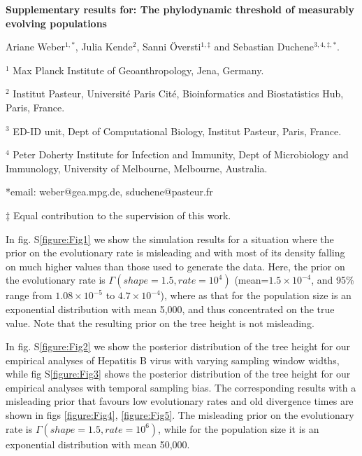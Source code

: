 \documentclass[11pt]{article}
\begin{document}
\begin{flushright}

\end{flushright}
\begin{center}
	\begin{LARGE}
	\textbf{Supplementary results for: The phylodynamic threshold of measurably evolving populations}
	\end{LARGE}


Ariane Weber$^{1,*}$, Julia Kende$^{2}$, Sanni Översti$^{1, \ddagger}$ and Sebastian Duchene$^{3,4,\ddagger, *}$.
\end{center}

$^{1}$ Max Planck Institute of Geoanthropology, Jena, Germany.

$^{2}$ Institut Pasteur, Université Paris Cité, Bioinformatics and Biostatistics Hub, Paris, France.

$^{3}$ ED-ID unit, Dept of Computational Biology, Institut Pasteur, Paris, France.

$^{4}$ Peter Doherty Institute for Infection and Immunity, Dept of Microbiology and Immunology, University of Melbourne, Melbourne, Australia.
\newline

*email: weber@gea.mpg.de, sduchene@pasteur.fr

$\ddagger$ Equal contribution to the supervision of this work.


In fig. S\ref{figure:Fig1} we show the simulation results for a situation where the prior on the evolutionary rate is misleading and with most of its density falling on much higher values than those used to generate the data. Here, the prior on the evolutionary rate is $\Gamma(shape=1.5, rate=10^{4})$ (mean=$1.5\times 10^{-4}$, and 95\% range from $1.08 \times 10^{-5}$ to $4.7 \times 10^{-4}$), where as that for the population size is an exponential distribution with mean 5,000, and thus concentrated on the true value. Note that the resulting prior on the tree height is not misleading.

In fig. S\ref{figure:Fig2} we show the posterior distribution of the tree height for our empirical analyses of Hepatitis B virus with varying sampling window widths, while fig S\ref{figure:Fig3} shows the posterior distribution of the tree height for our empirical analyses with temporal sampling bias. The corresponding results with a misleading prior that favours low evolutionary rates and old divergence times are shown in figs \ref{figure:Fig4}, \ref{figure:Fig5}. The misleading prior on the evolutionary rate is $\Gamma(shape=1.5, rate=10^6)$, while for the population size it is an exponential distribution with mean 50,000.
\end{document}

